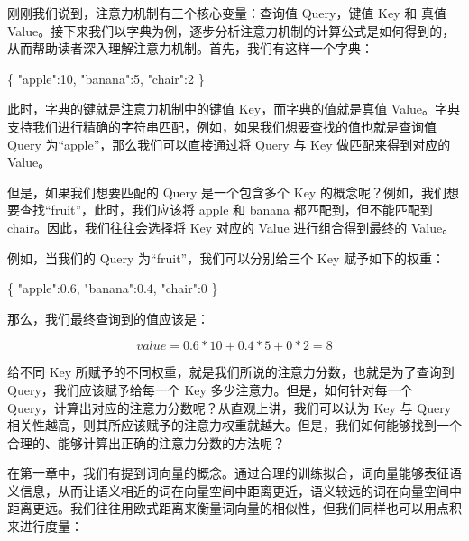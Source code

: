 \documentclass[
]{article}
\newenvironment{Shaded}{}{}
\newcommand{\DataTypeTok}[1]{\textcolor[rgb]{0.56,0.13,0.00}{#1}}
\newcommand{\DecValTok}[1]{\textcolor[rgb]{0.25,0.63,0.44}{#1}}
\newcommand{\FloatTok}[1]{\textcolor[rgb]{0.25,0.63,0.44}{#1}}
\newcommand{\FunctionTok}[1]{\textcolor[rgb]{0.02,0.16,0.49}{#1}}
\begin{document}
刚刚我们说到，注意力机制有三个核心变量：查询值 Query，键值 Key 和 真值
Value。接下来我们以字典为例，逐步分析注意力机制的计算公式是如何得到的，从而帮助读者深入理解注意力机制。首先，我们有这样一个字典：

\begin{Shaded}
\begin{Highlighting}[]
\FunctionTok{\{}
    \DataTypeTok{"apple"}\FunctionTok{:}\DecValTok{10}\FunctionTok{,}
    \DataTypeTok{"banana"}\FunctionTok{:}\DecValTok{5}\FunctionTok{,}
    \DataTypeTok{"chair"}\FunctionTok{:}\DecValTok{2}
\FunctionTok{\}}
\end{Highlighting}
\end{Shaded}

此时，字典的键就是注意力机制中的键值 Key，而字典的值就是真值
Value。字典支持我们进行精确的字符串匹配，例如，如果我们想要查找的值也就是查询值
Query 为``apple''，那么我们可以直接通过将 Query 与 Key
做匹配来得到对应的 Value。

但是，如果我们想要匹配的 Query 是一个包含多个 Key
的概念呢？例如，我们想要查找``fruit''，此时，我们应该将 apple 和 banana
都匹配到，但不能匹配到 chair。因此，我们往往会选择将 Key 对应的 Value
进行组合得到最终的 Value。

例如，当我们的 Query 为``fruit''，我们可以分别给三个 Key
赋予如下的权重：

\begin{Shaded}
\begin{Highlighting}[]
\FunctionTok{\{}
    \DataTypeTok{"apple"}\FunctionTok{:}\FloatTok{0.6}\FunctionTok{,}
    \DataTypeTok{"banana"}\FunctionTok{:}\FloatTok{0.4}\FunctionTok{,}
    \DataTypeTok{"chair"}\FunctionTok{:}\DecValTok{0}
\FunctionTok{\}}
\end{Highlighting}
\end{Shaded}

那么，我们最终查询到的值应该是：

\[
value = 0.6 * 10 + 0.4 * 5 + 0 * 2 = 8
\]

给不同 Key 所赋予的不同权重，就是我们所说的注意力分数，也就是为了查询到
Query，我们应该赋予给每一个 Key 多少注意力。但是，如何针对每一个
Query，计算出对应的注意力分数呢？从直观上讲，我们可以认为 Key 与 Query
相关性越高，则其所应该赋予的注意力权重就越大。但是，我们如何能够找到一个合理的、能够计算出正确的注意力分数的方法呢？

在第一章中，我们有提到词向量的概念。通过合理的训练拟合，词向量能够表征语义信息，从而让语义相近的词在向量空间中距离更近，语义较远的词在向量空间中距离更远。我们往往用欧式距离来衡量词向量的相似性，但我们同样也可以用点积来进行度量：
\end{document}
